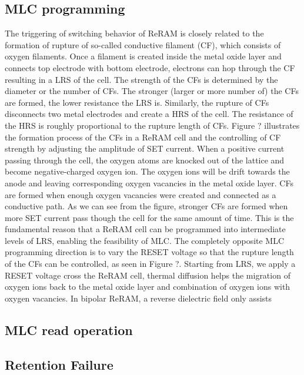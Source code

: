 \subsection{MLC programming}
The triggering of switching behavior of ReRAM is closely related to the formation of rupture of so-called conductive filament (CF), which consists of oxygen filaments. Once a filament is created inside the metal oxide layer and connects top electrode with bottom electrode, electrons can hop through the CF resulting in a LRS of the cell. The strength of the CFs is determined by the diameter or the number of CFs. The stronger (larger or more number of) the CFs are formed, the lower resistance the LRS is. Similarly, the rupture of CFs disconnects two metal electrodes and create a HRS of the cell. The resistance of the HRS is roughly proportional to the rupture length of CFs. Figure ? illustrates the formation process of the CFs in a ReRAM cell and the controlling of CF strength by adjusting the amplitude of SET current. When a positive current passing through the cell, the oxygen atoms are knocked out of the lattice and become negative-charged oxygen ion. The oxygen ions will be drift towards the anode and leaving corresponding oxygen vacancies in the metal oxide layer. CFs are formed when enough oxygen vacancies were created and connected as a conductive path. As we can see from the figure, stronger CFs are formed when more SET current pass though the cell for the same amount of time. This is the fundamental reason that a ReRAM cell can be programmed into intermediate levels of LRS, enabling the feasibility of MLC. The completely opposite MLC programming direction is to vary the RESET voltage so that the rupture length of the CFs can be controlled, as seen in Figure ?. Starting from LRS, we apply a RESET voltage cross the ReRAM cell, thermal diffusion helps the migration of oxygen ions back to the metal oxide layer and combination of oxygen ions with oxygen vacancies. In bipolar ReRAM, a reverse dielectric field only assists
 
\subsection{MLC read operation}

\subsection{Retention Failure}

